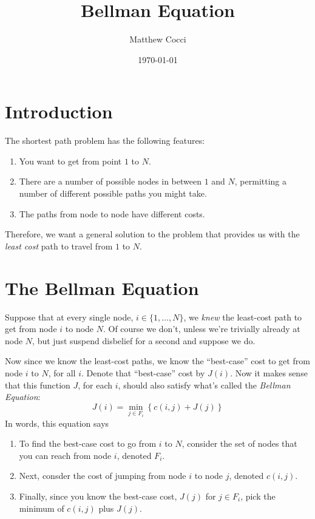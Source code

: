 \documentclass[a4paper,12pt]{scrartcl}
\author{Matthew Cocci}
\title{Bellman Equation}
\date{\today}
\begin{document}
\maketitle



\section{Introduction}

The shortest path problem has the following features:
\begin{enumerate}

    \item You want to get from point $1$ to $N$.

    \item There are a number of possible nodes in between $1$ and $N$,
	permitting a number of different possible paths you might take.

    \item The paths from node to node have different costs.

\end{enumerate}

Therefore, we want a general solution to the problem that
provides us with the \emph{least cost} path to travel from
$1$ to $N$.


\section{The Bellman Equation}

Suppose that at every single node, $i \in \{1, \ldots, N\}$, we \emph{knew}
the least-cost path to get from node $i$ to node $N$. Of course we don't,
unless we're trivially already at node $N$, but just suspend disbelief for
a second and suppose we do.

Now since we know the least-cost paths, we know the ``best-case'' cost to
get from node $i$ to $N$, for all $i$. Denote that ``best-case'' cost
by $J(i)$. Now it makes sense that this function
$J$, for each $i$, should also satisfy what's called the
\emph{Bellman Equation}:
\begin{equation}
    \label{bellman}
    J(i) = \min_{j \in F_i} \left\{ c(i, j) + J(j) \right\}
\end{equation}
In words, this equation says
\begin{enumerate}
    \item To find the best-case cost to go from $i$
	to $N$, consider the set of nodes that you can reach from node $i$,
	denoted $F_i$.

    \item Next, consder the cost of jumping from node $i$ to node $j$,
	denoted $c(i,j)$.

    \item Finally, since you know the best-case cost,
	$J(j)$ for $j \in F_i$, pick the minimum of $c(i,j)$ plus $J(j)$.
\end{enumerate} 
\end{document}
